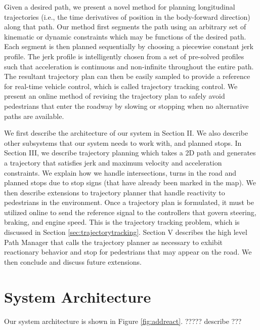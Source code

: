 \documentclass[letterpaper, 10 pt, conference]{ieeeconf}  %
\begin{document}
Given a desired path, we present a novel method for planning longitudinal trajectories (i.e., the time derivatives of position in the body-forward direction) along that path.
Our method first segments the path using an arbitrary set of kinematic or dynamic constraints which may be functions of the desired path.
Each segment is then planned sequentially by choosing a piecewise constant jerk profile.
The jerk profile is intelligently chosen from a set of pre-solved profiles such that acceleration is continuous and non-infinite throughout the entire path.
The resultant trajectory plan can then be easily sampled to provide a reference for real-time vehicle control, which is called trajectory tracking control.
We present an online method of revising the trajectory plan to safely avoid pedestrians that enter the roadway by slowing or stopping when no alternative paths are available.

We first describe the architecture of our system in Section II. We also describe other subsystems that our system needs to work with, and planned stops.
In Section III, we describe trajectory planning which takes a 2D path and generates a trajectory that satisfies jerk and maximum velocity and acceleration constraints. 
We explain how we handle intersections, turns in the road and planned stops due to stop signs (that have already been marked in the map).
We then describe extensions to trajectory planner that handle reactivity to pedestrians in the environment. 
Once a trajectory plan is formulated, it must be utilized online to send the reference signal to the controllers that govern steering, braking, and engine speed.
This is the trajectory tracking problem, which is discussed in Section \ref{sec:trajectorytracking}.
Section V describes the high level Path Manager that calls the trajectory planner as necessary to 
exhibit reactionary behavior and stop for pedestrians that may appear on the road.
We then conclude and discuss future extensions.


\section{System Architecture} \label{sec:systemarchirectureg}


Our system architecture is shown in Figure \ref{fig:addreact}.
????? describe ???
\end{document}
